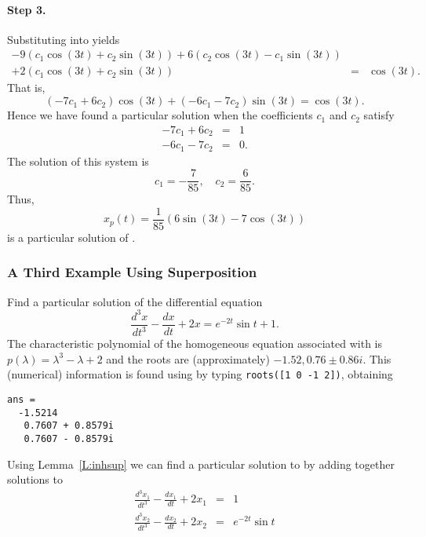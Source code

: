 \documentclass{ximera}
\begin{document}
\paragraph{Step 3.} Substituting  into  yields
\begin{eqnarray*}
-9(c_1\cos(3t)+c_2 \sin(3t)) +6(c_2\cos(3t)-c_1\sin(3t)) & & \\
+2(c_1 \cos(3t)+ c_2 \sin(3t)) &  = & \cos(3t).
\end{eqnarray*}
That is,
\[
(-7c_1+6c_2)\cos(3t)+(-6c_1-7c_2)\sin(3t) = \cos(3t).
\]
Hence we have found a particular solution when the coefficients $c_1$ and 
$c_2$ satisfy 
\begin{eqnarray*}
-7c_1 +6c_2 & = & 1\\
-6c_1 -7c_2 & = & 0.
\end{eqnarray*}
The solution of this system is 
\[
c_1 = -\frac{7}{85},\quad c_2 = \frac{6}{85}.
\]
Thus, 
\[
x_p(t) = \frac{1}{85}(6\sin(3t)-7\cos(3t))
\]
is a particular solution of .

\subsubsection*{A Third Example Using Superposition}

Find a particular solution of the differential equation
\begin{equation}  \label{e:underdet3}
\frac{d^3x}{dt^3} -\frac{dx}{dt} + 2x = e^{-2t}\sin t + 1.
\end{equation}
The characteristic polynomial of the homogeneous equation associated with 
 is $p(\lambda)=\lambda^3-\lambda+2$ and the roots are 
(approximately) $-1.52, 0.76 \pm 0.86i$.  This (numerical) information is
found using \Matlab by typing 
{\tt roots([1 0 -1 2])}, obtaining
\begin{verbatim}
ans =
  -1.5214       
   0.7607 + 0.8579i     
   0.7607 - 0.8579i
\end{verbatim}

Using Lemma~\ref{L:inhsup} we can find a particular solution to 
 by adding together solutions to 
\begin{eqnarray}
\frac{d^3x_1}{dt^3} -\frac{dx_1}{dt} + 2x_1 & = & 1 \label{e:underdet3-1}\\
\frac{d^3x_2}{dt^3} -\frac{dx_2}{dt} + 2x_2 & = & e^{-2t}\sin t 
\label{e:underdet3-2}
\end{eqnarray}
\end{document}
